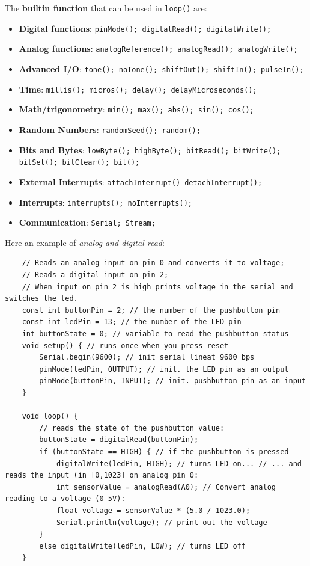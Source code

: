 \documentclass[10pt,a4paper]{report}
\theoremstyle{definition}
\begin{document}
The \textbf{builtin function} that can be used in \texttt{loop()} are:
\begin{itemize}
	\item 
	\textbf{Digital functions}: \texttt{pinMode(); digitalRead(); digitalWrite();}
	\item 
	\textbf{Analog functions}: \texttt{analogReference(); analogRead(); analogWrite();}
	\item 
	\textbf{Advanced I/O}: \texttt{tone(); noTone(); shiftOut(); shiftIn(); pulseIn();}
	\item 
	\textbf{Time}: \texttt{millis(); micros(); delay(); delayMicroseconds();}
	\item 
	\textbf{Math/trigonometry}: \texttt{min(); max(); abs(); sin(); cos();}
	\item 
	\textbf{Random Numbers}: \texttt{randomSeed(); random();}
	\item 
	\textbf{Bits and Bytes}: \texttt{lowByte(); highByte(); bitRead(); bitWrite(); bitSet(); bitClear(); bit();}
	\item 
	\textbf{External Interrupts}: \texttt{attachInterrupt() detachInterrupt();}
	\item 
	\textbf{Interrupts}: \texttt{interrupts(); noInterrupts();}
	\item 
	\textbf{Communication}: \texttt{Serial; Stream;}
\end{itemize}

Here an example of \textit{analog and digital read}:
\begin{lstlisting}
	// Reads an analog input on pin 0 and converts it to voltage; 
	// Reads a digital input on pin 2; 
	// When input on pin 2 is high prints voltage in the serial and switches the led. 
	const int buttonPin = 2; // the number of the pushbutton pin 
	const int ledPin = 13; // the number of the LED pin 
	int buttonState = 0; // variable to read the pushbutton status
	void setup() { // runs once when you press reset
		Serial.begin(9600); // init serial lineat 9600 bps
		pinMode(ledPin, OUTPUT); // init. the LED pin as an output 
		pinMode(buttonPin, INPUT); // init. pushbutton pin as an input
	}
	
	void loop() { 
		// reads the state of the pushbutton value:
		buttonState = digitalRead(buttonPin); 
		if (buttonState == HIGH) { // if the pushbutton is pressed
			digitalWrite(ledPin, HIGH); // turns LED on... // ... and reads the input (in [0,1023] on analog pin 0:
			int sensorValue = analogRead(A0); // Convert analog reading to a voltage (0-5V): 
			float voltage = sensorValue * (5.0 / 1023.0);
			Serial.println(voltage); // print out the voltage
		} 
		else digitalWrite(ledPin, LOW); // turns LED off 
	}
\end{lstlisting}
\end{document}
